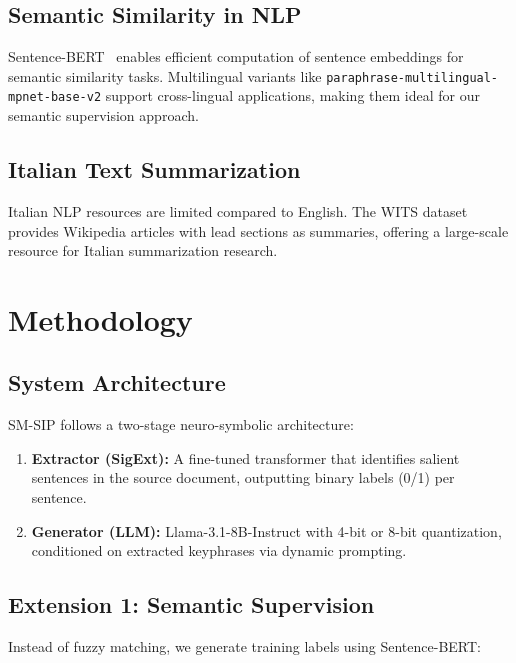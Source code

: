\documentclass[conference]{IEEEtran}
\begin{document}
\subsection{Semantic Similarity in NLP}
Sentence-BERT~\cite{reimers2019sbert} enables efficient computation of sentence embeddings for semantic similarity tasks. Multilingual variants like \texttt{paraphrase-multilingual-mpnet-base-v2} support cross-lingual applications, making them ideal for our semantic supervision approach.

\subsection{Italian Text Summarization}
Italian NLP resources are limited compared to English. The WITS dataset~\cite{casola2021wits} provides Wikipedia articles with lead sections as summaries, offering a large-scale resource for Italian summarization research.

\section{Methodology}

\subsection{System Architecture}

SM-SIP follows a two-stage neuro-symbolic architecture:

\begin{enumerate}
    \item \textbf{Extractor (SigExt):} A fine-tuned transformer that identifies salient sentences in the source document, outputting binary labels (0/1) per sentence.
    \item \textbf{Generator (LLM):} Llama-3.1-8B-Instruct with 4-bit or 8-bit quantization, conditioned on extracted keyphrases via dynamic prompting.
\end{enumerate}

\subsection{Extension 1: Semantic Supervision}
\label{sec:semantic}

Instead of fuzzy matching, we generate training labels using Sentence-BERT:
\end{document}
